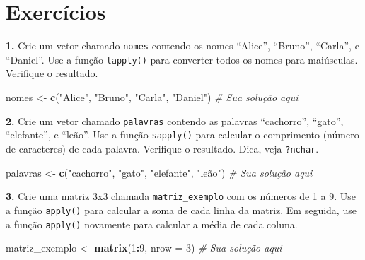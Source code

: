 \documentclass[
]{book}
\newenvironment{Shaded}{\begin{snugshade}}{\end{snugshade}}
\newcommand{\AttributeTok}[1]{\textcolor[rgb]{0.13,0.29,0.53}{#1}}
\newcommand{\CommentTok}[1]{\textcolor[rgb]{0.56,0.35,0.01}{\textit{#1}}}
\newcommand{\DecValTok}[1]{\textcolor[rgb]{0.00,0.00,0.81}{#1}}
\newcommand{\DocumentationTok}[1]{\textcolor[rgb]{0.56,0.35,0.01}{\textbf{\textit{#1}}}}
\newcommand{\FunctionTok}[1]{\textcolor[rgb]{0.13,0.29,0.53}{\textbf{#1}}}
\newcommand{\NormalTok}[1]{#1}
\newcommand{\OtherTok}[1]{\textcolor[rgb]{0.56,0.35,0.01}{#1}}
\newcommand{\SpecialCharTok}[1]{\textcolor[rgb]{0.81,0.36,0.00}{\textbf{#1}}}
\newcommand{\StringTok}[1]{\textcolor[rgb]{0.31,0.60,0.02}{#1}}
\begin{document}
\begin{Shaded}
\end{Shaded}

\section{Exercícios}\label{exercuxedcios-13}

\textbf{1.} Crie um vetor chamado \texttt{nomes} contendo os nomes ``Alice'', ``Bruno'',
``Carla'', e ``Daniel''. Use a função \texttt{lapply()} para converter todos os
nomes para maiúsculas. Verifique o resultado.

\begin{Shaded}
\begin{Highlighting}[]
\NormalTok{nomes }\OtherTok{\textless{}{-}} \FunctionTok{c}\NormalTok{(}\StringTok{"Alice"}\NormalTok{, }\StringTok{"Bruno"}\NormalTok{, }\StringTok{"Carla"}\NormalTok{, }\StringTok{"Daniel"}\NormalTok{)}
\CommentTok{\# Sua solução aqui}
\end{Highlighting}
\end{Shaded}

\textbf{2.} Crie um vetor chamado \texttt{palavras} contendo as palavras ``cachorro'',
``gato'', ``elefante'', e ``leão''. Use a função \texttt{sapply()} para calcular o
comprimento (número de caracteres) de cada palavra. Verifique o
resultado. Dica, veja \texttt{?nchar}.

\begin{Shaded}
\begin{Highlighting}[]
\NormalTok{palavras }\OtherTok{\textless{}{-}} \FunctionTok{c}\NormalTok{(}\StringTok{"cachorro"}\NormalTok{, }\StringTok{"gato"}\NormalTok{, }\StringTok{"elefante"}\NormalTok{, }\StringTok{"leão"}\NormalTok{)}
\CommentTok{\# Sua solução aqui}
\end{Highlighting}
\end{Shaded}

\textbf{3.} Crie uma matriz 3x3 chamada \texttt{matriz\_exemplo} com os números de 1
a 9. Use a função \texttt{apply()} para calcular a soma de cada linha da
matriz. Em seguida, use a função \texttt{apply()} novamente para calcular a
média de cada coluna.

\begin{Shaded}
\begin{Highlighting}[]
\NormalTok{matriz\_exemplo }\OtherTok{\textless{}{-}} \FunctionTok{matrix}\NormalTok{(}\DecValTok{1}\SpecialCharTok{:}\DecValTok{9}\NormalTok{, }\AttributeTok{nrow =} \DecValTok{3}\NormalTok{)}
\CommentTok{\# Sua solução aqui}
\end{Highlighting}
\end{Shaded}
\end{document}
